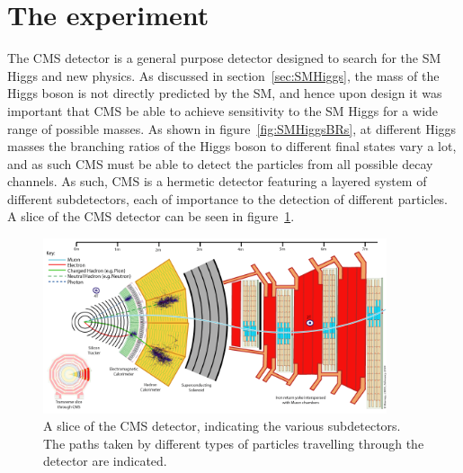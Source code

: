\section{The \CMS experiment}
\label{sec:CMSInDetail}

The CMS detector is a general purpose detector designed to search for the
\ac{SM} Higgs and new physics. As discussed in section~\ref{sec:SMHiggs}, the
mass of the Higgs boson is not directly predicted by the \ac{SM}, and hence upon
design it was important that CMS be able to achieve sensitivity to the \ac{SM} Higgs for a
wide range of possible masses. As shown in figure~\ref{fig:SMHiggsBRs}, at different
Higgs masses the branching ratios of the Higgs boson to different final states
vary a lot, and as such CMS must be able to detect the particles from all
possible decay channels. As such, CMS is a hermetic detector featuring
a layered system of different subdetectors, each of importance to the detection
of different particles. A slice of the CMS detector can be seen in
figure~\ref{fig:CMSslice}.

\begin{figure}[htbp]
   \includegraphics[width=0.9\textwidth]{plots/detector/CMS_Slice.png}
\caption{A slice of the CMS detector, indicating the various subdetectors. The
paths taken by different types of particles travelling through the detector are
indicated.}
\label{fig:CMSslice}
\end{figure}

